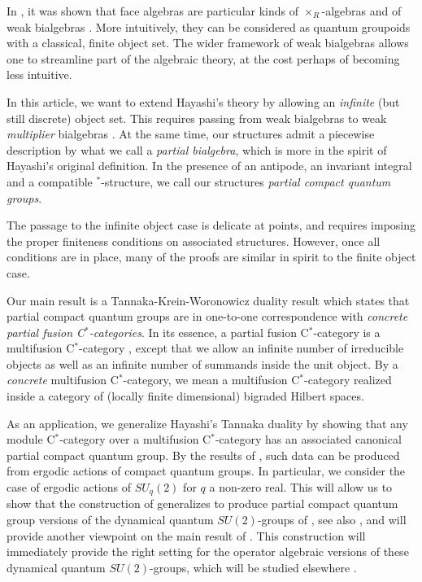 \documentclass[11pt]{article}
\theoremstyle{definition}
\numberwithin{equation}{section}
\begin{document}
In \cite{Nil1,Sch1,Sch2}, it was shown that face algebras are particular kinds of $\times_R$-algebras \cite{Tak2} and of weak bialgebras \cite{Boh3}. More intuitively, they can be considered as quantum groupoids with a classical, finite object set. The wider framework of weak bialgebras allows one to streamline part of the algebraic theory, at the cost perhaps of becoming less intuitive. 

In this article, we want to extend Hayashi's theory by allowing an \emph{infinite} (but still discrete) object set. This requires passing from weak bialgebras to weak \emph{multiplier} bialgebras \cite{Boh1}. At the same time, our structures admit a piecewise description by what we call a \emph{partial bialgebra}, which is more in the spirit of Hayashi's original definition. In the presence of an antipode, an invariant integral and a compatible $^*$-structure, we call our structures \emph{partial compact quantum groups}. 

The passage to the infinite object case is delicate at points, and requires imposing the proper finiteness conditions on associated structures. However, once all conditions are in place, many of the proofs are similar in spirit to the finite object case. %

Our main result is a Tannaka-Krein-Woronowicz duality result which states that partial compact quantum groups are in one-to-one correspondence with \emph{concrete partial fusion C$^*$-categories}. In its essence, a partial fusion C$^*$-category is a multifusion C$^*$-category \cite{ENO1}, except that we allow an infinite number of irreducible objects as well as an infinite number of summands inside the unit object. By a \emph{concrete} multifusion C$^*$-category, we mean a multifusion C$^*$-category realized inside a category of (locally finite dimensional) bigraded Hilbert spaces. 


As an application, we generalize Hayashi's Tannaka duality by showing that any module C$^*$-category over a multifusion C$^*$-category has an associated canonical partial compact quantum group. By the results of \cite{DCY1}, such data can be produced from ergodic actions of compact quantum groups. In particular,  we consider the case of ergodic actions of $SU_q(2)$ for $q$ a non-zero real. This will allow us to show that the construction of \cite{Hay4} generalizes to produce partial compact quantum group versions of the dynamical quantum $SU(2)$-groups of \cite{EtV1,KoR1}, see also \cite{EtN1}, and will provide another viewpoint on the main result of \cite{Sto1}. This construction will immediately provide the right setting for the operator algebraic versions of these dynamical quantum $SU(2)$-groups, which will be studied elsewhere \cite{DCT2}.
\end{document}
